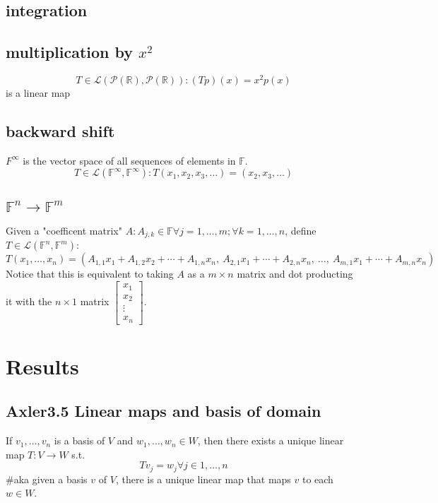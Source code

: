 \documentclass[letterpaper]{article}
\begin{document}
\subsection{integration}
\label{sec:org41fa46f}
\subsection{multiplication by \(x^2\)}
\label{sec:org1b984df}
$$T \in \mathcal{L}\left(\mathcal{P}(\mathbb{R}), \mathcal{P}(\mathbb{R})\right) : (Tp)(x) = x^2p(x)$$
 is a linear map
\subsection{backward shift}
\label{sec:org93e603c}
\(F^\infty\) is the vector space of all sequences of elements in \(\mathbb{F}\).
$$T \in \mathcal{L}\left(\mathbb{F}^\infty, \mathbb{F}^\infty\right) : T(x_1, x_2, x_3, \ldots) = (x_2, x_3, \ldots)$$
\subsection{\(\mathbb{F}^n \to \mathbb{F}^m\)}
\label{sec:org5b5740b}
Given a "coefficent matrix" \(A : A_{j,k}\in\mathbb{F} \forall j=1,\ldots,m; \forall k=1,\ldots,n\), define \(T \in \mathcal{L}(\mathbb{F}^n, \mathbb{F}^m)\):
$$T(x_1, \ldots, x_n) = (A_{1,1}x_1 + A_{1,2}x_2 + \cdots + A_{1,n}x_n,\ A_{2,1}x_1 + \cdots + A_{2, n}x_n,\ \ldots,\ A_{m, 1}x_1 + \cdots + A_{m, n} x_n)$$
Notice that this is equivalent to taking \(A\) as a \(m\times n\) matrix and dot producting it with the \(n \times 1\) matrix \(\begin{bmatrix}x_1 \\ x_2 \\ \vdots \\ x_n\end{bmatrix}\).
\section{Results}
\label{sec:orgfd0c0e7}
\subsection{Axler3.5 Linear maps and basis of domain}
\label{sec:orgede23e7}
If \(v_1, \ldots, v_n\) is a basis of \(V\) and \(w_1, \ldots, w_n \in W\), then there exists a unique linear map \(T : V\to W\) s.t.
$$T v_j = w_j \forall j \in 1, \ldots, n$$
\#aka given a basis \(v\) of \(V\), there is a unique linear map that maps \(v\) to each \(w \in W\).
\end{document}
